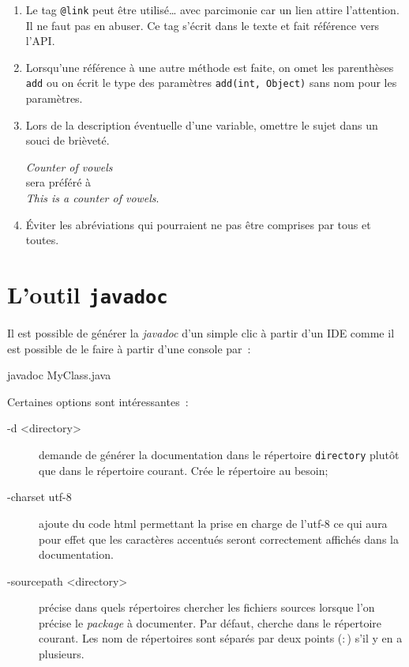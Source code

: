 \begin{enumerate}
	\item Le tag \texttt{@link} peut être utilisé… avec parcimonie car un lien
		attire l'attention. Il ne faut pas en abuser. Ce tag s'écrit dans le
		texte et fait référence vers l'API.

	\item Lorsqu'une référence à une autre méthode est faite, on omet les
		parenthèses \texttt{add} ou on écrit le type des paramètres
		\texttt{add(int, Object)} sans nom pour les paramètres. 

	\item Lors de la description éventuelle d'une variable, omettre le sujet
		dans un souci de brièveté. 

		\medskip
		\textit{Counter of vowels}\\
		sera préféré à\\
		\textit{This is a counter of vowels}.

	\item Éviter les abréviations qui pourraient ne pas être comprises par tous
		et toutes. 

\end{enumerate}







\section{L'outil \texttt{javadoc}}

Il est possible de générer la \textit{javadoc} d'un simple clic à partir d'un IDE comme il est possible de le faire à partir d'une console par~:

\begin{term}
	javadoc MyClass.java
\end{term}

Certaines options sont intéressantes~:

\begin{description}

	\item[-d <directory>] demande de générer la documentation dans le
		répertoire \texttt{directory} plutôt que dans le répertoire courant.
		Crée le répertoire au besoin;

	\item[-charset utf-8] ajoute du code html permettant la prise en charge de
		l'utf-8 ce qui aura pour effet que les caractères accentués seront
		correctement affichés dans la documentation. 

	\item[-sourcepath <directory>] précise dans quels répertoires chercher les
		fichiers sources lorsque l'on précise le \textit{package} à documenter.
		Par défaut, cherche dans le répertoire courant. Les nom de répertoires
		sont séparés par deux points ($:$) s'il y en a plusieurs.

\end{description}

